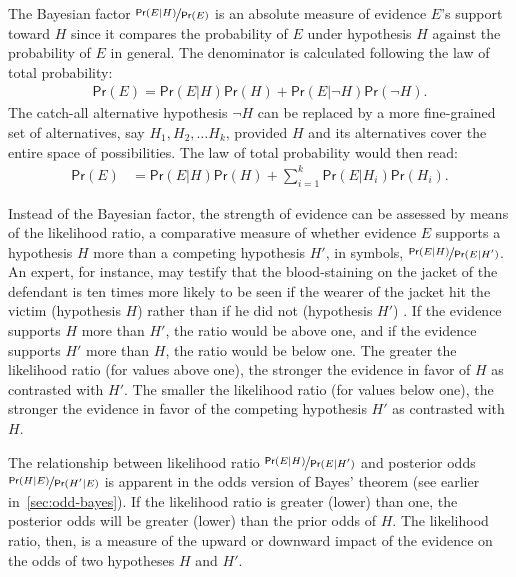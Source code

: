 \documentclass{article}
\newcommand{\pr}{\mathsf{Pr}}
\begin{document}
The Bayesian factor $\nicefrac{\pr(E \vert H)}{\pr(E)}$
is an absolute measure of evidence $E$'s support toward $H$ since it compares the probability of $E$ under hypothesis $H$ against the probability of $E$ in general. 
The denominator is calculated following the law of total probability:
\begin{align*}\pr(E)= \pr(E \vert H) \pr(H)+\pr(E \vert \neg H) \pr(\neg H).\end{align*}
The catch-all alternative hypothesis $\neg H$ can be replaced by a more fine-grained set of alternatives, say $H_1, H_2, \dots H_k$, provided $H$ and its alternatives cover the entire space of possibilities. The law of total probability would then read:
\begin{align*}
\pr(E) & = \pr(E\vert H)\pr(H) +\sum_{i=1}^k \pr(E\vert H_i)\pr(H_i). 
\end{align*}





Instead of the Bayesian factor, the strength of evidence can be assessed by means of the likelihood ratio, a comparative measure of whether evidence $E$ supports a hypothesis $H$ more than a competing hypothesis $H'$, in symbols, $\nicefrac{\pr(E \vert H)}{\pr(E \vert H')}$. 
An expert, for instance, may testify that the blood-staining on the jacket of the defendant is ten times more likely to be seen if the wearer of the jacket hit the victim (hypothesis $H$) rather than if he did not (hypothesis $H'$) \citep[p.\ 38]{aitken2010fundamentals}. 
If the evidence supports $H$ more than $H'$, the ratio would be above one, and if the evidence supports $H'$ more than $H$, the ratio would be below one.  The greater the likelihood ratio (for values above one), the stronger the evidence in favor of $H$ as contrasted with $H'$. The smaller the likelihood ratio (for values below one), the stronger the evidence in favor of the competing hypothesis $H'$ as contrasted with $H$. 




The relationship between likelihood ratio $\nicefrac{\pr(E \vert H)}{\pr(E \vert H')}$ and  posterior odds \linebreak $\nicefrac{\pr(H \vert E)}{\pr(H' \vert E)}$ is apparent in 
the odds version of Bayes' theorem (see earlier in~\ref{sec:odd-bayes}). %
If the likelihood ratio is greater (lower) than one, the posterior odds will be greater (lower) than the prior odds of $H$. The likelihood ratio, then, is a measure of the upward or downward impact of the evidence on the odds of two hypotheses $H$ and $H'$.
\end{document}
